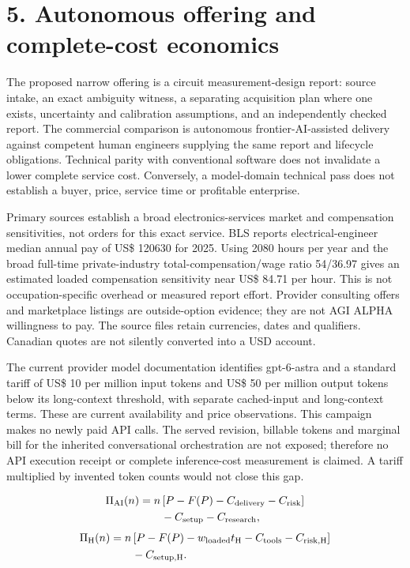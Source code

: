 \documentclass[10pt,letterpaper]{article}
\begin{document}
\section*{\color{accent}5. Autonomous offering and complete-cost economics}
The proposed narrow offering is a circuit measurement-design report: source intake, an exact ambiguity witness, a separating acquisition plan where one exists, uncertainty and calibration assumptions, and an independently checked report. The commercial comparison is autonomous frontier-AI-assisted delivery against competent human engineers supplying the same report and lifecycle obligations. Technical parity with conventional software does not invalidate a lower complete service cost. Conversely, a model-domain technical pass does not establish a buyer, price, service time or profitable enterprise.\par
Primary sources establish a broad electronics-services market and compensation sensitivities, not orders for this exact service. BLS reports electrical-engineer median annual pay of US\$ 120630 for 2025. Using 2080 hours per year and the broad full-time private-industry total-compensation/wage ratio 54/36.97 gives an estimated loaded compensation sensitivity near US\$ 84.71 per hour. This is not occupation-specific overhead or measured report effort. Provider consulting offers and marketplace listings are outside-option evidence; they are not AGI ALPHA willingness to pay. The source files retain currencies, dates and qualifiers. Canadian quotes are not silently converted into a USD account.\par
The current provider model documentation identifies gpt-6-astra and a standard tariff of US\$ 10 per million input tokens and US\$ 50 per million output tokens below its long-context threshold, with separate cached-input and long-context terms. These are current availability and price observations. This campaign makes no newly paid API calls. The served revision, billable tokens and marginal bill for the inherited conversational orchestration are not exposed; therefore no API execution receipt or complete inference-cost measurement is claimed. A tariff multiplied by invented token counts would not close this gap.\par
\[ \begin{aligned}\Pi_{\rm AI}(n)&=n\,[P-F(P)-C_{\rm delivery}-C_{\rm risk}]\\&\qquad-C_{\rm setup}-C_{\rm research},\end{aligned} \]
\[ \begin{aligned}\Pi_{\rm H}(n)&=n\,[P-F(P)-w_{\rm loaded}t_{\rm H}-C_{\rm tools}-C_{\rm risk,H}]\\&\qquad-C_{\rm setup,H}.\end{aligned} \]
\end{document}
